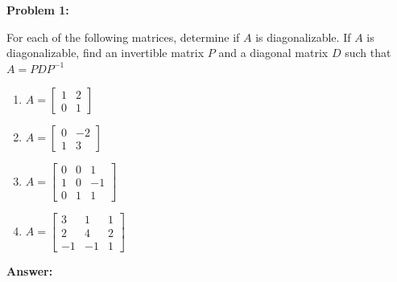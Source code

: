 \documentclass[10pt,letterpaper,final]{report}
\begin{document}
\begin{center}
  \vline
\end{center}

\medskip
\noindent\textbf{Problem 1:}
\medskip

For each of the following matrices, determine if $A$ is diagonalizable. If $A$ is diagonalizable, find an invertible matrix $P$ and a diagonal matrix $D$ such that $A = PDP^{-1}$

\begin{enumerate}[label=(\alph*)]
  \item $A = \begin{bmatrix}
            1 & 2 \\
            0 & 1
          \end{bmatrix}$
  \item $A = \begin{bmatrix}
            0 & -2 \\
            1 & 3
          \end{bmatrix}$
  \item $A = \begin{bmatrix}
            0 & 0 & 1  \\
            1 & 0 & -1 \\
            0 & 1 & 1
          \end{bmatrix}$
  \item $A = \begin{bmatrix}
            3  & 1  & 1 \\
            2  & 4  & 2 \\
            -1 & -1 & 1
          \end{bmatrix}$
\end{enumerate}

\medskip
\noindent\textbf{Answer:}
\end{document}

